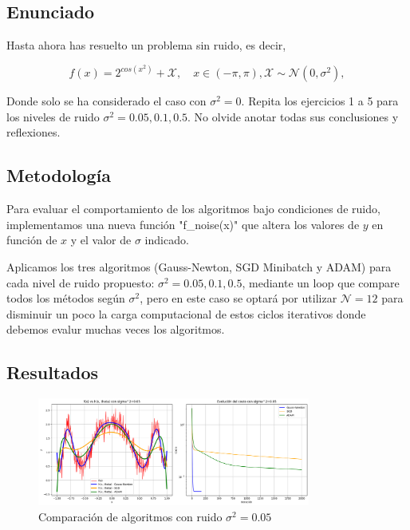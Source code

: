 \documentclass{article}
\begin{document}
\subsection{Enunciado}

Hasta ahora has resuelto un problema sin ruido, es decir,

\begin{equation*}
    f(x)=2^{cos(x^2)}+\mathcal{X}, \quad x \in (-\pi,\pi), \mathcal{X} \sim \mathcal{N}(0,\sigma^{2}),
\end{equation*}

Donde solo se ha considerado el caso con $\sigma^2=0$. Repita los ejercicios 1 a 5 para los niveles de ruido $\sigma^2 = 0.05,0.1,0.5$. No olvide anotar todas sus conclusiones y reflexiones.

\subsection{Metodología}

Para evaluar el comportamiento de los algoritmos bajo condiciones de ruido, implementamos una nueva función "f\_noise(x)" que altera los valores de $y$ en función de $x$ y el valor de $\sigma$ indicado.

Aplicamos los tres algoritmos (Gauss-Newton, SGD Minibatch y ADAM) para cada nivel de ruido propuesto: $\sigma^2 = 0.05, 0.1, 0.5$, mediante un loop que compare todos los métodos según $\sigma^2$, pero en este caso se optará por utilizar $\mathcal{N}=12$ para disminuir un poco la carga computacional de estos ciclos iterativos donde debemos evalur muchas veces los algoritmos.

\subsection{Resultados}
\setcounter{equation}{0}

\begin{figure}[H]
    \centering
    \includegraphics[width=0.8\textwidth]{images/6_sigma_05.png}
    \caption{Comparación de algoritmos con ruido $\sigma^2 = 0.05$}
    \label{fig:noise_005}
\end{figure}
\end{document}

